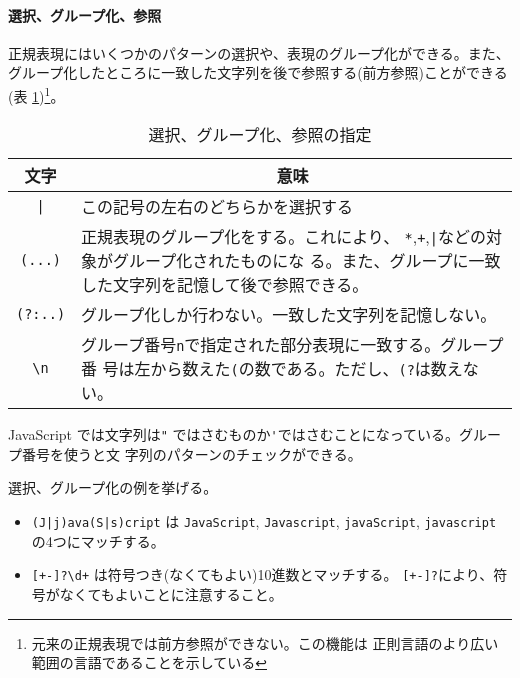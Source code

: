 \paragraph{選択、グループ化、参照}
正規表現にはいくつかのパターンの選択や、表現のグループ化ができる。また、
グループ化したところに一致した文字列を後で参照する(前方参照)ことができる(表
\ref{select})\footnote{元来の正規表現では前方参照ができない。この機能は
正則言語のより広い範囲の言語であることを示している}。
\begin{table}[ht]
\caption{選択、グループ化、参照の指定}\label{select}
\begin{center}
 \begin{tabular}{|c|m{}|}\hline
  文字&\multicolumn{1}{c|}{意味}\\\hline
\Verb+|+&この記号の左右のどちらかを選択する\\\hline
\Verb+(...)+&正規表現のグループ化をする。これにより、
      \Verb-*-,\Verb-+-,\Verb-|-などの対象がグループ化されたものにな
      る。また、グループに一致した文字列を記憶して後で参照できる。\\\hline
\Verb+(?:..)+&グループ化しか行わない。一致した文字列を記憶しない。\\\hline
\Verb+\n+&グループ番号\Verb+n+で指定された部分表現に一致する。グループ番
      号は左から数えた\Verb+(+の数である。ただし、\Verb+(?+は数えない。\\\hline
\end{tabular}
\end{center}
\end{table}

JavaScript では文字列は\Verb+"+%
ではさむものか\Verb+'+ではさむことになっている。グループ番号を使うと文
字列のパターンのチェックができる。
\begin{Exec}
選択、グループ化の例を挙げる。
\begin{itemize}\upshape
 \item \Verb-(J|j)ava(S|s)cript- は 
\Verb-JavaScript-, 
\Verb-Javascript-,
\Verb-javaScript-,
\Verb-javascript- の4つにマッチする。
 \item \Verb/[+-]?\d+/ は符号つき(なくてもよい)10進数とマッチする。
\Verb/[+-]?/により、符号がなくてもよいことに注意すること。
\end{itemize}
\end{Exec}

